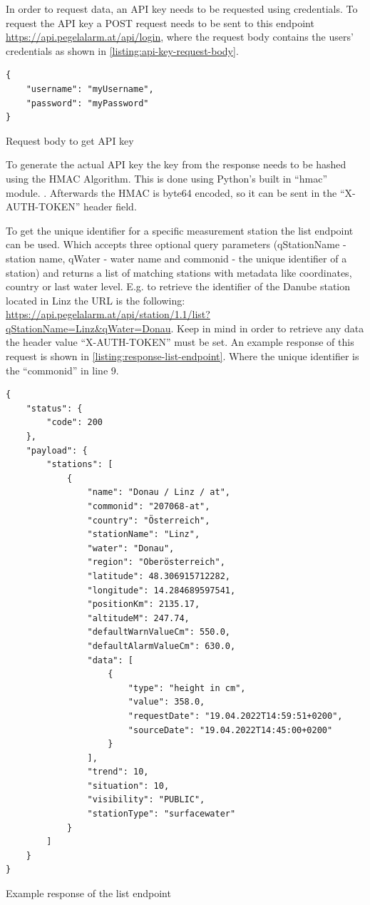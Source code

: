 In order to request data, an API key needs to be requested using credentials. To request the API key a POST request needs to be sent to this endpoint \url{https://api.pegelalarm.at/api/login}, where the request body contains the users' credentials as shown in \autoref{listing:api-key-request-body}. 
\begin{listing}
\begin{verbatim}
{
    "username": "myUsername",
    "password": "myPassword"
}
\end{verbatim}
\caption{Request body to get API key}
\label{listing:api-key-request-body}
\end{listing}
To generate the actual API key the key from the response needs to be hashed using the \ac{HMAC} Algorithm. This is done using Python's built in ``hmac'' module. \cite{HmacKeyedHashingMessage}. Afterwards the HMAC is byte64 encoded, so it can be sent in the ``X-AUTH-TOKEN'' header field.

To get the unique identifier for a specific measurement station the list endpoint can be used. Which accepts three optional query parameters (qStationName - station name, qWater - water name and commonid - the unique identifier of a station) and returns a list of matching stations with metadata like coordinates, country or last water level. E.g. to retrieve the identifier of the Danube station located in Linz the URL is the following: \url{https://api.pegelalarm.at/api/station/1.1/list?qStationName=Linz&qWater=Donau}. Keep in mind in order to retrieve any data the header value ``X-AUTH-TOKEN'' must be set. An example response of this request is shown in \autoref{listing:response-list-endpoint}. Where the unique identifier is the ``commonid'' in line 9.
\begin{listing}
\begin{verbatim}
{
    "status": {
        "code": 200
    },
    "payload": {
        "stations": [
            {
                "name": "Donau / Linz / at",
                "commonid": "207068-at",
                "country": "Österreich",
                "stationName": "Linz",
                "water": "Donau",
                "region": "Oberösterreich",
                "latitude": 48.306915712282,
                "longitude": 14.284689597541,
                "positionKm": 2135.17,
                "altitudeM": 247.74,
                "defaultWarnValueCm": 550.0,
                "defaultAlarmValueCm": 630.0,
                "data": [
                    {
                        "type": "height in cm",
                        "value": 358.0,
                        "requestDate": "19.04.2022T14:59:51+0200",
                        "sourceDate": "19.04.2022T14:45:00+0200"
                    }
                ],
                "trend": 10,
                "situation": 10,
                "visibility": "PUBLIC",
                "stationType": "surfacewater"
            }
        ]
    }
}
\end{verbatim}
\caption{Example response of the list endpoint}
\label{listing:response-list-endpoint}
\end{listing}

